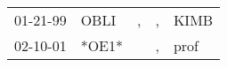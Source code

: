 \begin{supertabular}{lllll}
 01-21-99 &   OBLI &  , &  , &  KIMB \\
 02-10-01 &  *OE1* &    &  , &  prof \\
\end{supertabular}
